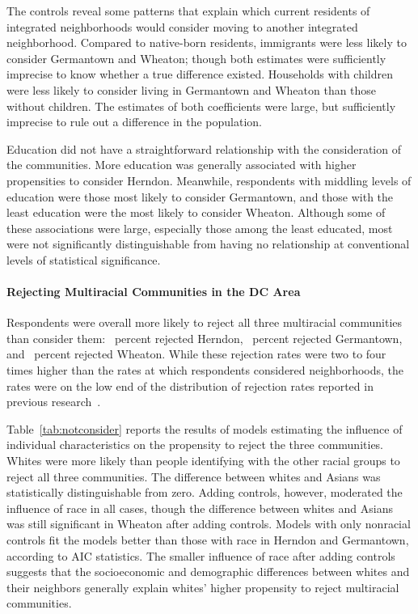 \documentclass{baderart}
\begin{document}
The controls reveal some patterns that explain which current residents of integrated neighborhoods would consider moving to another integrated neighborhood. Compared to native-born residents, immigrants were less likely to consider Germantown and Wheaton; though both estimates were sufficiently imprecise to know whether a true difference existed. Households with children were less likely to consider living in Germantown and Wheaton than those without children. The estimates of both coefficients were large, but sufficiently imprecise to rule out a difference in the population. 

Education did not have a straightforward relationship with the consideration of the communities. More education was generally associated with higher propensities to consider Herndon. Meanwhile, respondents with middling levels of education were those most likely to consider Germantown, and those with the least education were the most likely to consider Wheaton. Although some of these associations were large, especially those among the least educated, most were not significantly distinguishable from having no relationship at conventional levels of statistical significance. 

\paragraph{Rejecting Multiracial Communities in the DC Area}\label{ssec:reject}

Respondents were overall more likely to reject all three multiracial communities than consider them: \ncherndon~percent rejected Herndon, \ncgermantown~percent rejected Germantown, and \ncwheaton~percent rejected Wheaton. While these rejection rates were two to four times higher than the rates at which respondents considered neighborhoods, the rates were on the low end of the distribution of rejection rates reported in previous research~\citep{krysan_perceiving_2007, bader_community_2015}. 

Table~\ref{tab:notconsider} reports the results of models estimating the influence of individual characteristics on the propensity to reject the three communities. Whites were more likely than people identifying with the other racial groups to reject all three communities. The difference between whites and Asians was statistically distinguishable from zero. Adding controls, however, moderated the influence of race in all cases, though the difference between whites and Asians was still significant in Wheaton after adding controls. Models with only nonracial controls fit the models better than those with race in Herndon and Germantown, according to AIC statistics. The smaller influence of race after adding controls suggests that the socioeconomic and demographic differences between whites and their neighbors generally explain whites' higher propensity to reject multiracial communities. 
\end{document}

